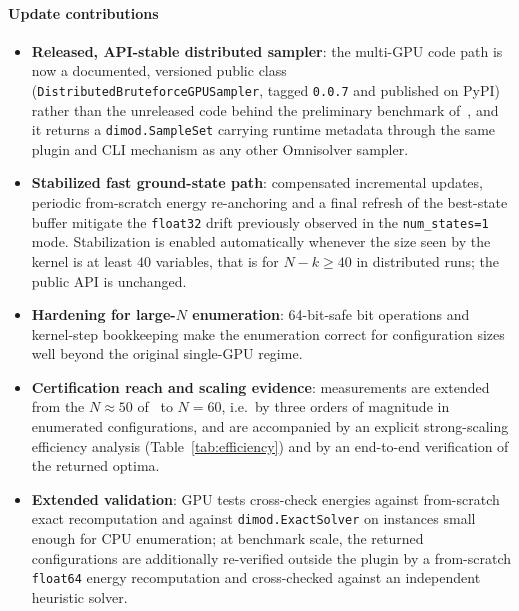\documentclass[preprint,12pt,a4paper]{elsarticle}
\begin{document}
\paragraph{Update contributions}
\begin{itemize}
    \item \textbf{Released, API-stable distributed sampler}: the multi-GPU code
    path is now a documented, versioned public class
    (\texttt{DistributedBruteforceGPUSampler}, tagged \texttt{0.0.7} and
    published on PyPI) rather than the unreleased code behind the preliminary
    benchmark of~\cite{jalowiecki2021omnisolver}, and it returns a
    \texttt{dimod.SampleSet} carrying runtime metadata through the same plugin
    and CLI mechanism as any other Omnisolver sampler.
    \item \textbf{Stabilized fast ground-state path}: compensated incremental
    updates, periodic from-scratch energy re-anchoring and a final refresh of the
    best-state buffer mitigate the \texttt{float32} drift previously observed
    in the \texttt{num\_states=1} mode. Stabilization is enabled automatically
    whenever the size seen by the kernel is at least $40$ variables, that is for
    $N-k \geq 40$ in distributed runs; the public API is unchanged.
    \item \textbf{Hardening for large-$N$ enumeration}: 64-bit-safe bit
    operations and kernel-step bookkeeping make the enumeration correct for
    configuration sizes well beyond the original single-GPU regime.
    \item \textbf{Certification reach and scaling evidence}: measurements are
    extended from the $N\approx 50$ of~\cite{jalowiecki2021omnisolver} to
    $N=60$, i.e.\ by three orders of magnitude in enumerated configurations, and
    are accompanied by an explicit strong-scaling efficiency analysis
    (Table~\ref{tab:efficiency}) and by an end-to-end verification of the
    returned optima.
    \item \textbf{Extended validation}: GPU tests cross-check energies against
    from-scratch exact recomputation and against \texttt{dimod.ExactSolver} on
    instances small enough for CPU enumeration; at benchmark scale, the returned
    configurations are additionally re-verified outside the plugin by a
    from-scratch \texttt{float64} energy recomputation and cross-checked against
    an independent heuristic solver.
\end{itemize}
\end{document}
